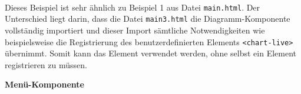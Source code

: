 \begin{enumerate}




 \hfill \\
Dieses Beispiel ist sehr ähnlich zu Beispiel 1 aus Datei \lstinline|main.html|. Der Unterschied liegt darin, dass die Datei \lstinline|main3.html| die Diagramm-Komponente vollständig importiert und dieser Import sämtliche Notwendigkeiten wie beispielsweise die Registrierung des benutzerdefinierten Elements \lstinline|<chart-live>| übernimmt. Somit kann das Element verwendet werden, ohne selbst ein Element registrieren zu müssen.
\end{enumerate}

\textbf{Menü-Komponente}